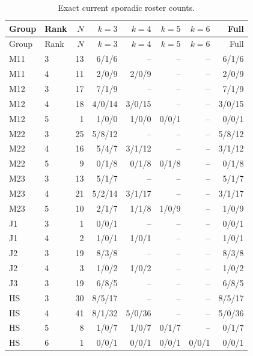 \begin{longtable}{llrrrrrr}
\caption{Exact current sporadic roster counts.}\label{counts}\\
\toprule Group&Rank&$N$&$k=3$&$k=4$&$k=5$&$k=6$&Full\\
\midrule\endfirsthead
\toprule Group&Rank&$N$&$k=3$&$k=4$&$k=5$&$k=6$&Full\\
\midrule\endhead
M11&3&13&6/1/6&--&--&--&6/1/6\\
M11&4&11&2/0/9&2/0/9&--&--&2/0/9\\
M12&3&17&7/1/9&--&--&--&7/1/9\\
M12&4&18&4/0/14&3/0/15&--&--&3/0/15\\
M12&5&1&1/0/0&1/0/0&0/0/1&--&0/0/1\\
M22&3&25&5/8/12&--&--&--&5/8/12\\
M22&4&16&5/4/7&3/1/12&--&--&3/1/12\\
M22&5&9&0/1/8&0/1/8&0/1/8&--&0/1/8\\
M23&3&13&5/1/7&--&--&--&5/1/7\\
M23&4&21&5/2/14&3/1/17&--&--&3/1/17\\
M23&5&10&2/1/7&1/1/8&1/0/9&--&1/0/9\\
J1&3&1&0/0/1&--&--&--&0/0/1\\
J1&4&2&1/0/1&1/0/1&--&--&1/0/1\\
J2&3&19&8/3/8&--&--&--&8/3/8\\
J2&4&3&1/0/2&1/0/2&--&--&1/0/2\\
J3&3&19&6/8/5&--&--&--&6/8/5\\
HS&3&30&8/5/17&--&--&--&8/5/17\\
HS&4&41&8/1/32&5/0/36&--&--&5/0/36\\
HS&5&8&1/0/7&1/0/7&0/1/7&--&0/1/7\\
HS&6&1&0/0/1&0/0/1&0/0/1&0/0/1&0/0/1\\
\bottomrule
\end{longtable}
